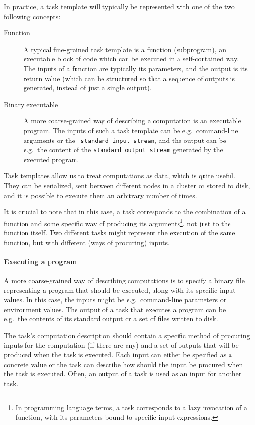 In practice, a task template will typically be represented with one of the two following concepts:
\begin{description}
	\item[Function] A typical fine-grained task template is a function (subprogram), an executable block of code which
		can be executed in a self-contained way. The inputs of a function are typically its parameters, and
		the output is its return value (which can be structured so that a sequence of outputs is generated,
		instead of just a single output).
	\item[Binary executable] A more coarse-grained way of describing a computation is an executable program. The inputs of such
		a task template can be e.g.\ command-line arguments or the \texttt{
		standard input stream}, and the output
		can be e.g.\ the content of the \texttt{standard output stream} generated by the executed program.
\end{description}

Task templates allow us to treat computations as data, which is quite useful. They can be
serialized, sent between different nodes in a cluster or stored to disk, and it is possible to
execute them an arbitrary number of times.

It is crucial to note that in this case, a task corresponds to the combination of a function and
some specific way of producing its arguments\footnote{In programming language terms, a task corresponds to a lazy invocation of a function, with its parameters bound to specific input expressions.}, not just to the function
itself. Two different tasks might represent the execution of the same function, but with different
(ways of procuring) inputs.

\paragraph{Executing a program} A more coarse-grained way of describing computations is to specify
a binary file representing a program that should be executed, along with its specific input values.
In this case, the inputs might be e.g.\ command-line parameters or environment values. The output
of a task that executes a program can be e.g.\ the contents of its standard output or a set of
files written to disk.

The task's computation description should contain a specific method of procuring inputs for the
computation (if there are any) and a set of outputs that will be produced when the task is
executed. Each input can either be specified as a concrete value or the task can describe how
should the input be procured when the task is executed. Often, an output of a task is used as an
input for another task.

